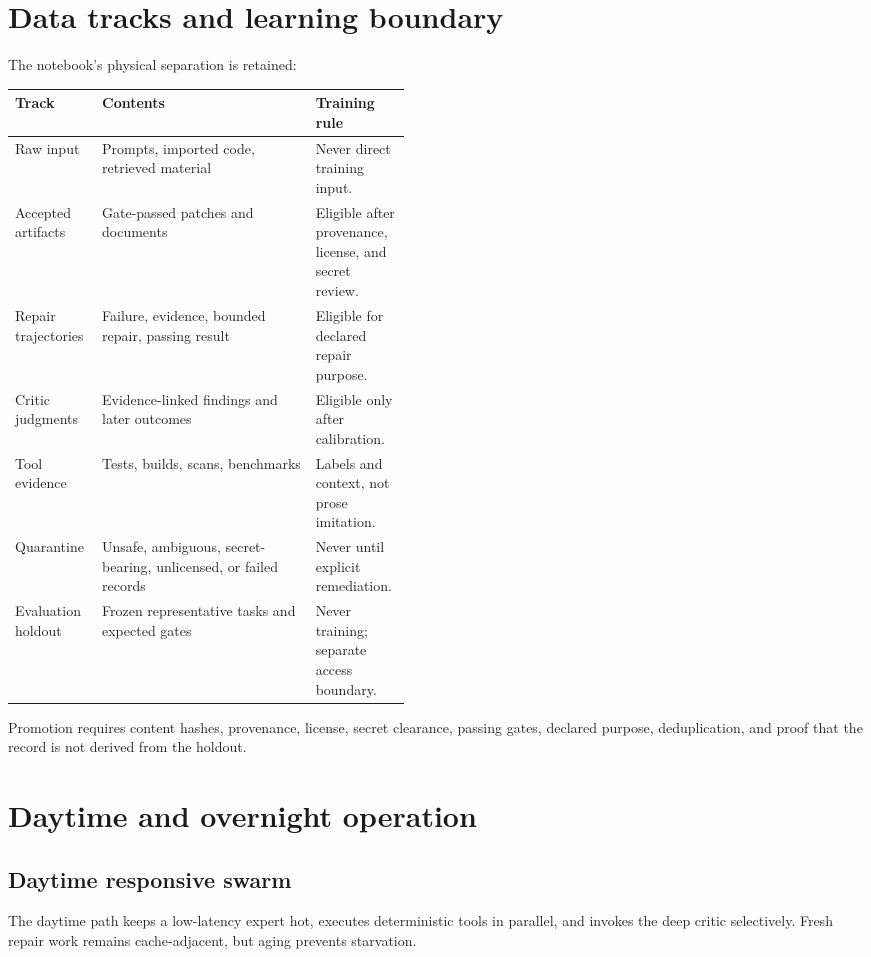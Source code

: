 \documentclass[11pt,letterpaper]{article}
\begin{document}
\section{Data tracks and learning boundary}

The notebook's physical separation is retained:

\begin{tabularx}{\linewidth}{@{}L{0.22\linewidth}Y L{0.24\linewidth}@{}}
\toprule
\textbf{Track} & \textbf{Contents} & \textbf{Training rule} \\
\midrule
Raw input &
Prompts, imported code, retrieved material &
Never direct training input. \\
Accepted artifacts &
Gate-passed patches and documents &
Eligible after provenance, license, and secret review. \\
Repair trajectories &
Failure, evidence, bounded repair, passing result &
Eligible for declared repair purpose. \\
Critic judgments &
Evidence-linked findings and later outcomes &
Eligible only after calibration. \\
Tool evidence &
Tests, builds, scans, benchmarks &
Labels and context, not prose imitation. \\
Quarantine &
Unsafe, ambiguous, secret-bearing, unlicensed, or failed records &
Never until explicit remediation. \\
Evaluation holdout &
Frozen representative tasks and expected gates &
Never training; separate access boundary. \\
\bottomrule
\end{tabularx}

Promotion requires content hashes, provenance, license, secret clearance,
passing gates, declared purpose, deduplication, and proof that the record is not
derived from the holdout.

\section{Daytime and overnight operation}

\subsection{Daytime responsive swarm}

The daytime path keeps a low-latency expert hot, executes deterministic tools
in parallel, and invokes the deep critic selectively. Fresh repair work remains
cache-adjacent, but aging prevents starvation.
\end{document}

